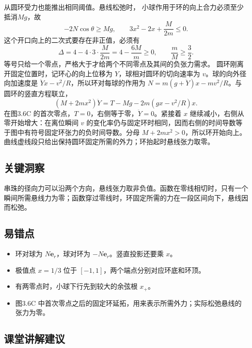 \documentclass[UTF8,fontset=fandol,a4paper,11pt]{ctexart}
\newcommand{\vect}[1]{\bm{#1}}
\begin{document}
从圆环受力也能推出相同阈值。悬线松弛时，
小球作用于环的向上合力必须至少抵消$Mg$，故
\[
-2N\cos\theta\geq Mg,
\qquad 3x^2-2x+\frac{M}{2m}\leq0.
\]
这个开口向上的二次式要存在非正值，必须有
\[
\Delta=4-4\cdot3\cdot\frac{M}{2m}
=4-\frac{6M}{m}\geq0,
\qquad\frac mM\geq\frac32.
\]
等号只给一个零点，严格大于才给两个不同零点及其间的负张力需求。
圆环刚离开固定位置时，记环心的向上位移为 $Y$，球相对圆环的切向速率为 $v$。球的向外径向加速度是 $\ddot Yx-v^2/R$，所以环对每球的作用为 $N=m(g+\ddot Y)x-mv^2/R$。与圆环的竖直方程联立，
\[
(M+2mx^2)\ddot Y=T-Mg-2m(gx-v^2/R)x.
\]
在图3.6C 的首次零点，$T=0$，右侧等于零，$\ddot Y=0$。紧接着 $x$ 继续减小，右侧从零开始增大：在离位瞬间 $v$ 的变化率仍与固定环时相同，因而右侧的时间导数等于图中有符号固定环张力的负时间导数。分母 $M+2mx^2>0$，所以环开始向上。曲线虚线段只给出保持圆环固定所需的外力；环抬起时悬线张力取零。




\subsection*{关键洞察}

串珠的径向力可以沿两个方向，悬线张力取非负值。函数在零线相切时，只有一个瞬间所需悬线力为零；函数穿过零线时，环固定所需的力在一段区间向下，悬线因而松弛。



\subsection*{易错点}

\begin{itemize}
\item 环对球为 $N\vect e_r$，球对环为 $-N\vect e_r$。竖直投影还要乘 $x$。
\item 极值点 $x=1/3$ 位于 $[-1,1]$，两个端点分别对应环底和环顶。
\item 有两零点时，小球下行先到较大的余弦根 $x_+$。
\item 图3.6C 中首次零点之后的固定环延拓，用来表示所需外力；实际松弛悬线的张力为零。
\end{itemize}



\subsection*{课堂讲解建议}
\end{document}
